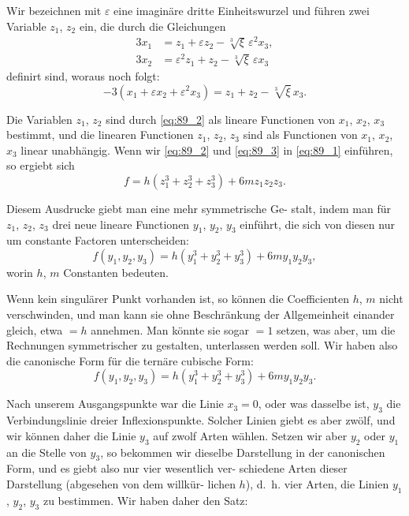 \documentclass[12pt,a4paper]{article}
\theoremstyle{plain}
\theoremstyle{definition}
\theoremstyle{remark}
\begin{document}
Wir bezeichnen mit $\varepsilon$ eine imaginäre dritte Einheitswurzel
und führen zwei Variable $z_1$, $z_2$ ein, die durch die Gleichungen
\begin{equation}\label{eq:89_2}
\begin{aligned}
3x_1 &= z_1 + \varepsilon z_2 - \sqrt[3]{\xi}\, \varepsilon^2 x_3, \\
3x_2 &= \varepsilon^2 z_1 + z_2 - \sqrt[3]{\xi}\, \varepsilon x_3
\end{aligned}
\end{equation}
definirt sind, woraus noch folgt:
\begin{equation}\label{eq:89_3}
-3(x_1 + \varepsilon x_2 + \varepsilon^2 x_3) = z_1 + z_2 - \sqrt[3]{\xi}\, x_3.
\end{equation}

Die Variablen $z_1$, $z_2$ sind durch \eqref{eq:89_2} als lineare Functionen
von $x_1$, $x_2$, $x_3$ bestimmt, und die linearen Functionen $z_1$, $z_2$, $z_3$
sind als Functionen von $x_1$, $x_2$, $x_3$ linear unabhängig. Wenn wir
\eqref{eq:89_2} und \eqref{eq:89_3} in \eqref{eq:89_1} einführen, so ergiebt sich
\begin{equation*}
f = h(z_1^3 + z_2^3 + z_3^3) + 6m z_1 z_2 z_3.
\end{equation*}

Diesem Ausdrucke giebt man eine mehr symmetrische Ge-
stalt, indem man für $z_1$, $z_2$, $z_3$ drei neue lineare Functionen
$y_1$, $y_2$, $y_3$ einführt, die sich von diesen nur um constante Factoren
unterscheiden:
\begin{equation*}
f(y_1, y_2, y_3) = h(y_1^3 + y_2^3 + y_3^3) + 6m y_1 y_2 y_3,
\end{equation*}
worin $h$, $m$ Constanten bedeuten.

Wenn kein singulärer Punkt vorhanden ist, so können die
Coefficienten $h$, $m$ nicht verschwinden, und man kann sie
ohne Beschränkung der Allgemeinheit einander gleich, etwa $= h$
annehmen. Man könnte sie sogar $= 1$ setzen, was aber, um die
Rechnungen symmetrischer zu gestalten, unterlassen werden
soll. Wir haben also die canonische Form für die ternäre
cubische Form:
\begin{equation}\label{eq:89_4}
f(y_1, y_2, y_3) = h(y_1^3 + y_2^3 + y_3^3) + 6m y_1 y_2 y_3.
\end{equation}

Nach unserem Ausgangspunkte war die Linie $x_3 = 0$, oder was
dasselbe ist, $y_3$ die Verbindungslinie dreier Inflexionspunkte.
Solcher Linien giebt es aber zwölf, und wir können daher die
Linie $y_3$ auf zwolf Arten wählen. Setzen wir aber $y_2$ oder $y_1$ an
die Stelle von $y_3$, so bekommen wir dieselbe Darstellung in der
canonischen Form, und es giebt also nur vier wesentlich ver-
schiedene Arten dieser Darstellung (abgesehen von dem willkür-
lichen $h$), d.~h. vier Arten, die Linien $y_1$, $y_2$, $y_3$ zu bestimmen. Wir
haben daher den Satz:
\end{document}
